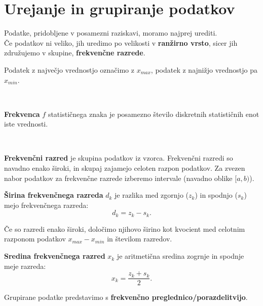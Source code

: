             \newpage
    \section{Urejanje in grupiranje podatkov}

        

            
                Podatke, pridobljene v posamezni raziskavi, moramo najprej urediti. \\
                Če podatkov ni veliko, jih uredimo po velikosti v \textbf{ranžirno vrsto}, sicer jih združujemo v skupine, \textbf{frekvenčne razrede}.
            

            
                Podatek z največjo vrednostjo označimo z $x_{max}$, podatek z najnižjo vrednostjo pa $x_{min}$.
            
                ~
            
                \textbf{Frekvenca} $f$ statističnega znaka je posamezno število diskretnih statističnih enot iste vrednosti.
            
                ~
            
                \textbf{Frekvenčni razred} je skupina podatkov iz vzorca. Frekvenčni razredi so navadno enako široki,
                in skupaj zajamejo celoten razpon podatkov. Za zvezen nabor podatkov za frekvenčne razrede izberemo intervale (navadno oblike $[a,b)$).
            

        

        
            
                \textbf{Širina frekvenčnega razreda} $d_k$ je razlika med zgornjo ($z_k$) in spodnjo ($s_k$) mejo frekvenčnega razreda:
                $$d_k=z_k-s_k.$$
            

            
                Če so razredi enako široki, določimo njihovo širino kot kvocient med celotnim razponom podatkov $x_{max}-x_{min}$ in številom razredov.
            

            
                \textbf{Sredina frekvenčnega razred} $x_k$ je aritmetična sredina zogrnje in spodnje meje razreda: 
                $$x_k=\dfrac{z_k+s_k}{2}.$$
            
        

        
            
                Grupirane podatke predstavimo s \textbf{frekvenčno preglednico/porazdelitvijo}.
            

